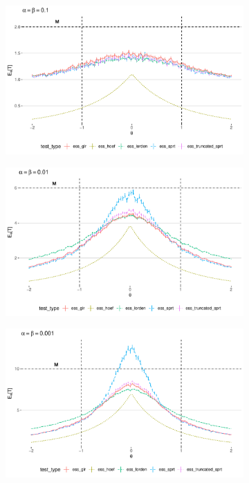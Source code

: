 \documentclass[11pt]{article}
\begin{document}
\begin{figure}
\centering
\begin{subfigure}{0.49\textwidth}
    \includegraphics[width=\textwidth]{images/ess_alpha1e1}
\end{subfigure}
\hfill
\begin{subfigure}{0.49\textwidth}
    \includegraphics[width=\textwidth]{images/ess_alpha1e2}
\end{subfigure}
\begin{subfigure}{0.49\textwidth}
    \includegraphics[width=\textwidth]{images/ess_alpha1e3}

\end{subfigure}
\end{figure}
\end{document}

